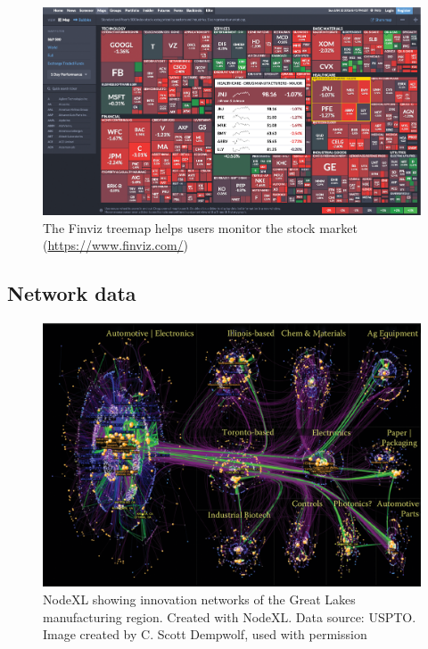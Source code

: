 \documentclass[]{krantz}
\begin{document}
\begin{figure}

{\centering \includegraphics[width=0.9\linewidth]{ChapterViz/figures/fig9-9} 

}

\caption{The Finviz treemap helps users monitor the stock market (\url{https://www.finviz.com/})}\label{fig:fig9-9}
\end{figure}

\subsection{Network data}\label{sec:viz-2.6}

\begin{figure}

{\centering \includegraphics[width=0.9\linewidth]{ChapterViz/figures/fig9-10} 

}

\caption{NodeXL showing innovation networks of the Great Lakes manufacturing region. Created with NodeXL. Data source: USPTO. Image created by C. Scott Dempwolf, used with permission}\label{fig:fig9-10}
\end{figure}
\end{document}
